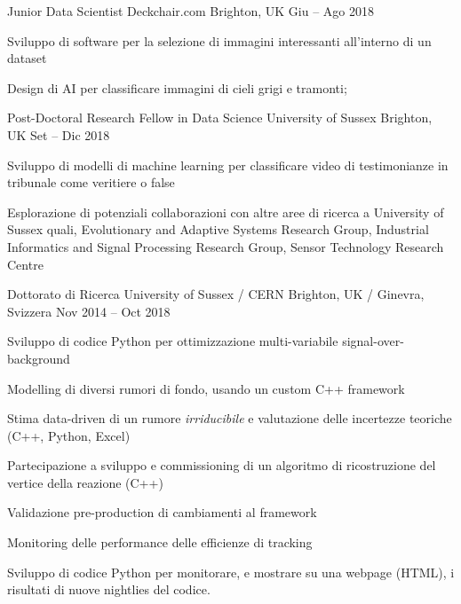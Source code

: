 \begin{cventries}
    \cventry
    {Junior Data Scientist}
    {Deckchair.com}
    {Brighton, UK}
    {Giu -- Ago 2018}
    {
      \begin{cvitems}
        \item Sviluppo di software per la selezione di immagini interessanti all'interno di un dataset
        \item Design di AI per classificare immagini di cieli grigi e tramonti;
      \end{cvitems}
    }
  \end{cventries}

  \begin{cventries}
    \cventry
    {Post-Doctoral Research Fellow in Data Science}
    {University of Sussex}
    {Brighton, UK}
    {Set -- Dic 2018}
    {
      \begin{cvitems}
        \item Sviluppo di modelli di machine learning per classificare video di testimonianze in tribunale come veritiere o false
        \item Esplorazione di potenziali collaborazioni con altre aree di ricerca a University of Sussex quali, Evolutionary and Adaptive Systems Research Group, Industrial Informatics and Signal Processing Research Group, Sensor Technology Research Centre
      \end{cvitems}
    }
  \end{cventries}

  \begin{cventries}    
    \cventry
    {Dottorato di Ricerca}
    {University of Sussex / CERN}
    {Brighton, UK / Ginevra, Svizzera}
    {Nov 2014 -- Oct 2018}
    {
    \begin{cvitems}
      \item Sviluppo di codice Python per ottimizzazione multi-variabile signal-over-background 
      \item Modelling di diversi rumori di fondo, usando un custom C++ framework
      \item Stima data-driven di un rumore \emph{irriducibile} e valutazione delle incertezze teoriche (C++, Python, Excel)
      \item Partecipazione a sviluppo e commissioning di un algoritmo di ricostruzione del vertice della reazione (C++)
      \item Validazione pre-production di cambiamenti al framework
      \item Monitoring delle performance delle efficienze di tracking
      \item Sviluppo di codice Python per monitorare, e mostrare su una webpage (HTML), i risultati di nuove nightlies del codice.
    \end{cvitems}
    }
  \end{cventries}

